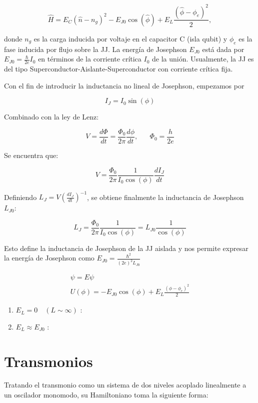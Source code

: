\documentclass[11pt, spanish]{report}
\begin{document}
\[
\hat{H} = E_C (\hat{n}-n_g)^2 - E_{J0} \cos( \hat{\phi} ) + E_L \frac{(\hat{\phi}-\phi_e)^2}{2},
\]

donde $n_g$ es la carga inducida por voltaje en el capacitor C (isla qubit) y $\phi_e$ es la fase inducida por flujo sobre la JJ. La energía de Josephson $E_{J0}$ está dada por $E_{J0}=\frac{\hbar}{2e}I_0$ en términos de la corriente crítica $I_0$ de la unión. Usualmente, la JJ es del tipo Superconductor-Aislante-Superconductor con corriente crítica fija.

Con el fin de introducir la inductancia no lineal de Josephson, empezamos por 

\[
I_J = I_0 \sin(\phi)
\]

Combinado con la ley de Lenz:

\[
V = \frac{d\Phi}{dt} = \frac{\Phi_0}{2\pi} \frac{d\phi}{dt}, \hspace{20pt} \Phi_0=\frac{h}{2e}
\]

Se encuentra que:

\[
V = \frac{\Phi_0}{2\pi} \frac{1}{I_0\cos(\phi)} \frac{dI_J}{dt}
\]

Definiendo $L_J = V (\frac{dI_J}{dt})^{-1}$, se obtiene finalmente la inductancia de Josephson $L_{J0}$:

\[
L_J = \frac{\Phi_0}{2\pi} \frac{1}{I_0 \cos(\phi)} = L_{J0} \frac{1}{\cos(\phi)}
\]

Esto define la inductancia de Josephson de la JJ aislada y nos permite expresar la energía de Josephson como $E_{J0} = \frac{\hbar^2}{(2e)^2L_{J0}}$

\begin{align*}
[E_C (-i\hbar \frac{\partial}{\partial\phi}-n_g)^2 + U(\phi)] \psi = E \psi \\
U(\phi) = -E_{J0} \cos(\phi) + E_L \frac{(\phi-\phi_e)^2}{2}
\end{align*}

\begin{enumerate}
\item $E_L = 0 \quad (L \sim \infty)$ :
\item $E_L \approx E_{J0}$ :
\end{enumerate}

\section{Transmonios}
Tratando el transmonio como un sistema de dos niveles acoplado linealmente a un oscilador monomodo, su Hamiltoniano toma la siguiente forma:
\end{document}
